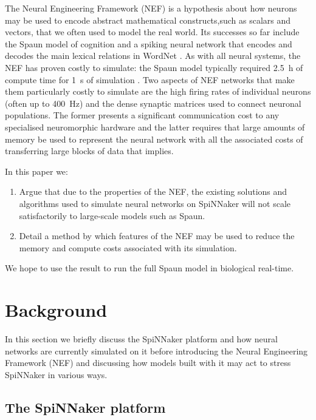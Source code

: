 \documentclass[conference]{IEEEtran}
\begin{document}
The Neural Engineering Framework (NEF) \parencite{Eliasmith2004} is a hypothesis about how neurons may be used to encode abstract mathematical constructs,such as scalars and vectors, that we often used to model the real world.
Its successes so far include the Spaun model of cognition \parencite{Eliasmith2012} and a spiking neural network that encodes and decodes the main lexical relations in WordNet \parencite{Crawford2013}.
As with all neural systems, the NEF has proven costly to simulate: the Spaun model typically required \SI{2.5}{\hour} of compute time for \SI{1}{\second} of simulation \parencite[\S V]{Stewart2014}.
Two aspects of NEF networks that make them particularly costly to simulate are the high firing rates of individual neurons (often up to \SI{400}{\hertz}) and the dense synaptic matrices used to connect neuronal populations.
The former presents a significant communication cost to any specialised neuromorphic hardware and the latter requires that large amounts of memory be used to represent the neural network with all the associated costs of transferring large blocks of data that implies.

  In this paper we:
  \begin{enumerate}
    \item Argue that due to the properties of the NEF, the existing solutions and algorithms used to simulate neural networks on SpiNNaker will not scale satisfactorily to large-scale models such as Spaun.
    \item Detail a method by which features of the NEF may be used to reduce the memory and compute costs associated with its simulation.
  \end{enumerate}

We hope to use the result to run the full Spaun model in biological real-time.

  \section{Background}

In this section we briefly discuss the SpiNNaker platform and how neural networks are currently simulated on it before introducing the Neural Engineering Framework (NEF) and discussing how models built with it may act to stress SpiNNaker in various ways.

  \subsection{The SpiNNaker platform}
\end{document}
